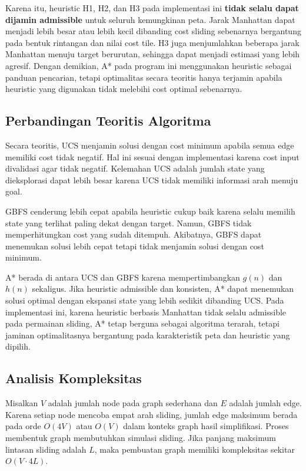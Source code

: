 \documentclass[a4paper,11pt]{article}
\begin{document}
Karena itu, heuristic H1, H2, dan H3 pada implementasi ini \textbf{tidak selalu dapat dijamin admissible} untuk seluruh kemungkinan peta. Jarak Manhattan dapat menjadi lebih besar atau lebih kecil dibanding cost sliding sebenarnya bergantung pada bentuk rintangan dan nilai cost tile. H3 juga menjumlahkan beberapa jarak Manhattan menuju target berurutan, sehingga dapat menjadi estimasi yang lebih agresif. Dengan demikian, A* pada program ini menggunakan heuristic sebagai panduan pencarian, tetapi optimalitas secara teoritis hanya terjamin apabila heuristic yang digunakan tidak melebihi cost optimal sebenarnya.

\subsection{Perbandingan Teoritis Algoritma}
Secara teoritis, UCS menjamin solusi dengan cost minimum apabila semua edge memiliki cost tidak negatif. Hal ini sesuai dengan implementasi karena cost input divalidasi agar tidak negatif. Kelemahan UCS adalah jumlah state yang dieksplorasi dapat lebih besar karena UCS tidak memiliki informasi arah menuju goal.

GBFS cenderung lebih cepat apabila heuristic cukup baik karena selalu memilih state yang terlihat paling dekat dengan target. Namun, GBFS tidak memperhitungkan cost yang sudah ditempuh. Akibatnya, GBFS dapat menemukan solusi lebih cepat tetapi tidak menjamin solusi dengan cost minimum.

A* berada di antara UCS dan GBFS karena mempertimbangkan $g(n)$ dan $h(n)$ sekaligus. Jika heuristic admissible dan konsisten, A* dapat menemukan solusi optimal dengan ekspansi state yang lebih sedikit dibanding UCS. Pada implementasi ini, karena heuristic berbasis Manhattan tidak selalu admissible pada permainan sliding, A* tetap berguna sebagai algoritma terarah, tetapi jaminan optimalitasnya bergantung pada karakteristik peta dan heuristic yang dipilih.

\subsection{Analisis Kompleksitas}
Misalkan $V$ adalah jumlah node pada graph sederhana dan $E$ adalah jumlah edge. Karena setiap node mencoba empat arah sliding, jumlah edge maksimum berada pada orde $O(4V)$ atau $O(V)$ dalam konteks graph hasil simplifikasi. Proses membentuk graph membutuhkan simulasi sliding. Jika panjang maksimum lintasan sliding adalah $L$, maka pembuatan graph memiliki kompleksitas sekitar $O(V \cdot 4L)$.
\end{document}
